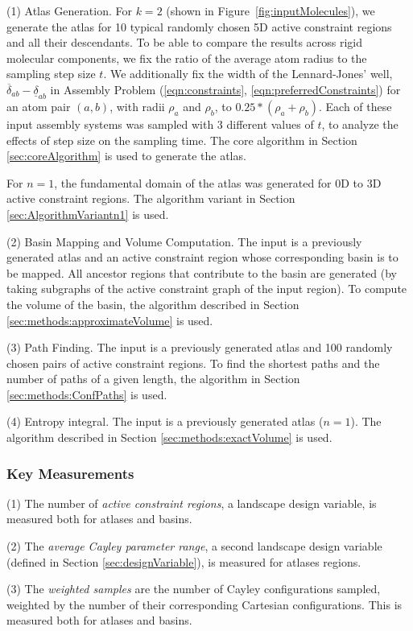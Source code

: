 \documentclass[]{article}
\newcommand{\figref}[1]{Figure~\ref{#1}}
\newcommand{\dst}{\delta}  \newcommand{\dlo}{\underline{\dst}}
\newcommand{\dhi}{\overline{\dst}}
\newcommand{\rmc}{rigid molecular component}
\newcommand{\ctwo}{\ref{eqn:preferredConstraints}}
\newcommand{\cone}{\ref{eqn:constraints}}
\newcommand{\pone}{a}
\newcommand{\ptwo}{b}
\newcommand{\ijx}{{\pone\ptwo}}
\begin{document}
(1) Atlas Generation. For $k=2$ (shown in \figref{fig:inputMolecules}), we
generate the atlas for 10 typical randomly chosen 5D active constraint regions
and all their descendants. To be able to compare the results across \rmc s, we
fix the ratio of the average atom radius to the sampling step size $t$.  We
additionally fix the width of the Lennard-Jones' well, $\dhi_\ijx -\dlo_\ijx$
in Assembly Problem (\cone, \ctwo) for an atom pair $(a, b)$, with radii
$\rho_a$ and $\rho_b$, to $0.25 * ( \rho_a + \rho_b)$. Each of these input
assembly systems was sampled with 3 different values of $t$, to analyze the
effects of step size on the sampling time. The core algorithm in Section
\ref{sec:coreAlgorithm} is used to generate the atlas.

For $n=1$, the fundamental domain of the atlas was generated for 0D to 3D
active constraint regions. The algorithm variant in Section
\ref{sec:AlgorithmVariantn1} is used. 

(2) Basin Mapping and Volume Computation. The input is a previously generated
atlas and an active constraint region whose corresponding basin is to be
mapped. All ancestor regions that contribute to the basin are generated (by
taking subgraphs of the active constraint graph of the input region). To
compute the volume of the basin, the algorithm described in Section
\ref{sec:methods:approximateVolume} is used.

(3) Path Finding. The input is a previously generated atlas and 100 randomly
chosen pairs of active constraint regions. To find the shortest paths and the
number of paths of a given length, the algorithm in Section
\ref{sec:methods:ConfPaths} is used.

(4) Entropy integral. The input is a previously generated atlas ($n=1$). The
algorithm described in Section \ref{sec:methods:exactVolume} is used.

\subsubsection{Key Measurements}
\label{sec:keyMeasurements}
(1) The number of {\sl active constraint regions}, a 
landscape design variable, is measured both for atlases and basins.

(2) The {\sl average Cayley parameter range}, a second landscape design variable 
(defined in Section \ref{sec:designVariable}), is measured for 
atlases regions.

(3) The {\sl weighted samples} are the number of Cayley configurations sampled,
weighted by the number of their corresponding Cartesian configurations. This
is measured both for atlases and basins. 
\end{document}
